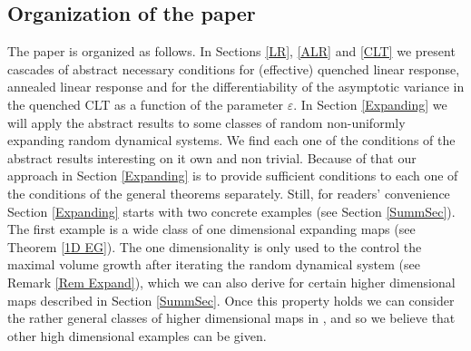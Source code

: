 \documentclass[11pt,reqno,a4paper]{article}
\theoremstyle{special}
\begin{document}
\subsection{Organization of the paper}\label{Sec1.3}
The paper is organized as follows. In Sections \ref{LR}, \ref{ALR} and \ref{CLT} we present cascades of abstract necessary conditions  for (effective) quenched linear response, annealed linear response   and for the  differentiability of the asymptotic variance in the quenched  CLT as a function of the parameter $\varepsilon$. In Section \ref{Expanding} we will apply the abstract results to some classes of random non-uniformly expanding random dynamical systems. We find each one of the  conditions of the abstract results interesting on it own and non trivial. Because of that our approach in Section \ref{Expanding}  is to provide sufficient conditions to each one of the conditions of the general theorems separately. Still, for readers' convenience  Section \ref{Expanding} starts with two concrete examples (see Section \ref{SummSec}). The first example is a wide class of one dimensional expanding maps (see Theorem \ref{1D EG}). The one dimensionality is only used to the control the maximal volume growth after iterating the random dynamical system (see Remark \ref{Rem Expand}), which we can also derive for certain higher dimensional maps described in Section \ref{SummSec}. Once this property holds we can consider the rather general classes of higher dimensional maps in \cite[Section 3.3]{YH 23}, and so we believe that other high dimensional examples can be given.








\end{document}

